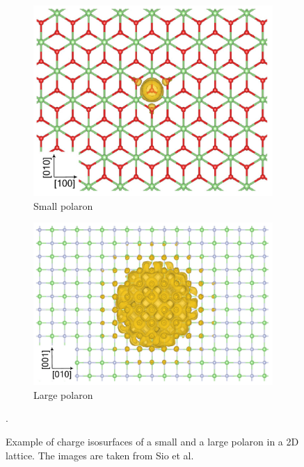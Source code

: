\begin{figure}[p]
    \begin{subfigure}[b]{0.42\textwidth}
        \centering
        \includegraphics[width=\textwidth]{figures/small.png}
        \caption{Small polaron}
        \label{fig:small}
    \end{subfigure}
    \hfill
    \begin{subfigure}[b]{0.49\textwidth}
        \centering
        \includegraphics[width=\textwidth]{figures/large.png}
        \caption{Large polaron}
        \label{fig:large}
    \end{subfigure}
    \caption[Charge isosurfaces of a small and a large polaron]{Example of charge isosurfaces of a small and a large polaron in a 2D lattice. The images are taken from Sio et al. \cite{sio2019}}.
    \label{fig:small_large}
\end{figure}
\vfill